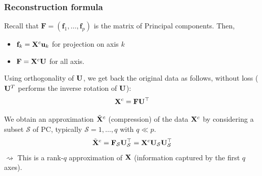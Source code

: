 \documentclass{beamer}\usepackage[]{graphicx}\usepackage[]{color}
\begin{document}
\begin{frame}
  \frametitle{Reconstruction formula}

    Recall that $\mathbf{F} = (\mathbf{f}_1, \dots, \mathbf{f}_p) $ is the matrix of Principal components. Then,  
    \begin{itemize}
      \item  $\mathbf{f}_k = \mathbf{X}^c \mathbf{u}_k$ for projection on axis $k$
      \item $\mathbf{F} = \mathbf{X}^c \mathbf{U}$ for all axis.
    \end{itemize}
    Using orthogonality of $\mathbf{U}$, we get back the original data as follows, without loss ($\mathbf{U}^T$ performs the inverse rotation of $\mathbf{U}$):
    \begin{equation*}
      \mathbf{X}^c = \mathbf{F}\mathbf{U}^\top 
    \end{equation*}

    \vfill
    \pause 
    
    We obtain an approximation $\tilde{\mathbf{X}}^c$ (compression) of the data $\mathbf{X}^c$ by considering a subset $\mathcal{S}$ of PC, typically $\mathcal{S} = {1, \dots, q}$ with $q \ll p$.
    \begin{equation*}
      \tilde{\mathbf{X}}^c = \mathbf{F}_{\mathcal{S}}\mathbf{U}_{\mathcal{S}}^\top = \mathbf{X}^c \mathbf{U}_{\mathcal{S}} \mathbf{U}_{\mathcal{S}}^\top
    \end{equation*}
    $\rightsquigarrow$ This is a rank-$q$ approximation of $\mathbf{X}$ (information captured by the first $q$ axes).

\end{frame}
\end{document}
